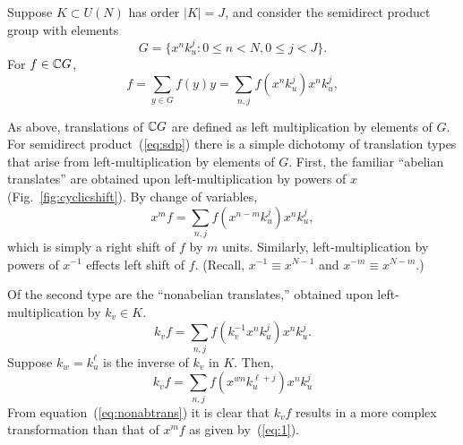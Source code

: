 Suppose $K \subset U(N)$ has order $|K|=J$, 
and consider the semidirect product group
with elements
\begin{equation}
  G   = \{x^n k_u^j : 0 \leq n < N, 0 \leq j < J\}.\label{eq:sdp}
\end{equation}
For $f\in \mathbb{C} G$, %
\begin{equation}
  f = \sum_{y\in G} f(y)y= \sum_{n,j} f(x^n k_u^j)x^n k_u^j,
\end{equation}

As above, translations of $\mathbb{C} G$ are defined as
left multiplication by elements of $G$.  
For semidirect product~(\ref{eq:sdp}) 
there is a simple dichotomy of translation types that arise
from left-multiplication by elements of $G$.  %
First, the familiar ``abelian translates'' 
are obtained upon left-multiplication by powers of $x$
(Fig.~\ref{fig:cyclicshift}).  
By change of variables, 
\begin{equation}\label{eq:1}
x^mf = \sum_{n,j} f(x^{n-m} k_u^j)x^n k_u^j,
\end{equation}
which is simply a right shift of $f$ by $m$ units.
Similarly, left-multiplication by powers of
$x^{-1}$ effects left shift of $f$. 
(Recall, $x^{-1} \equiv x^{N-1}$
and $x^{-m} \equiv x^{N-m}$.)  

Of the second type are the ``nonabelian translates,'' 
obtained upon left-multiplication by $k_v \in K$.
\begin{equation}
  k_vf %
  = \sum_{n,j} f(k_v^{-1}x^n k_u^j)x^n k_u^j.
\end{equation}
Suppose $k_w = k_u^\ell$ is the inverse of $k_v$ in $K$.  Then,
\begin{equation}
  k_vf %
  = \sum_{n,j} f(x^{wn}k_u^{\ell + j})x^n k_u^j\label{eq:nonabtrans}
\end{equation}
From equation~(\ref{eq:nonabtrans}) it is clear that $k_vf$ 
results in a more complex transformation than that of 
$x^m f$ as given by~(\ref{eq:1}).


